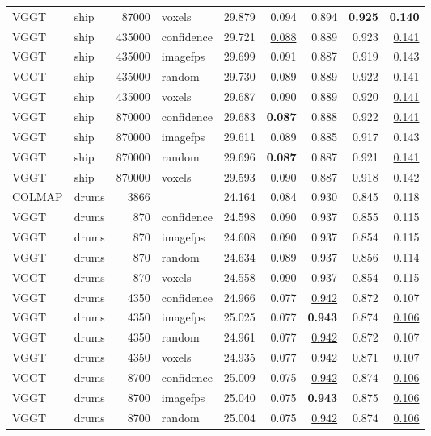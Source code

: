 \begin{table}[H]
\begin{tabular}{llrlrrrrr}
VGGT & ship & 87000 & voxels & 29.879 & 0.094 & 0.894 & \textbf{0.925} & \textbf{0.140} \\
VGGT & ship & 435000 & confidence & 29.721 & \underline{0.088} & 0.889 & 0.923 & \underline{0.141} \\
VGGT & ship & 435000 & imagefps & 29.699 & 0.091 & 0.887 & 0.919 & 0.143 \\
VGGT & ship & 435000 & random & 29.730 & 0.089 & 0.889 & 0.922 & \underline{0.141} \\
VGGT & ship & 435000 & voxels & 29.687 & 0.090 & 0.889 & 0.920 & \underline{0.141} \\
VGGT & ship & 870000 & confidence & 29.683 & \textbf{0.087} & 0.888 & 0.922 & \underline{0.141} \\
VGGT & ship & 870000 & imagefps & 29.611 & 0.089 & 0.885 & 0.917 & 0.143 \\
VGGT & ship & 870000 & random & 29.696 & \textbf{0.087} & 0.887 & 0.921 & \underline{0.141} \\
VGGT & ship & 870000 & voxels & 29.593 & 0.090 & 0.887 & 0.918 & 0.142 \\
\midrule
COLMAP & drums & 3866 &  & 24.164 & 0.084 & 0.930 & 0.845 & 0.118 \\
VGGT & drums & 870 & confidence & 24.598 & 0.090 & 0.937 & 0.855 & 0.115 \\
VGGT & drums & 870 & imagefps & 24.608 & 0.090 & 0.937 & 0.854 & 0.115 \\
VGGT & drums & 870 & random & 24.634 & 0.089 & 0.937 & 0.856 & 0.114 \\
VGGT & drums & 870 & voxels & 24.558 & 0.090 & 0.937 & 0.854 & 0.115 \\
VGGT & drums & 4350 & confidence & 24.966 & 0.077 & \underline{0.942} & 0.872 & 0.107 \\
VGGT & drums & 4350 & imagefps & 25.025 & 0.077 & \textbf{0.943} & 0.874 & \underline{0.106} \\
VGGT & drums & 4350 & random & 24.961 & 0.077 & \underline{0.942} & 0.872 & 0.107 \\
VGGT & drums & 4350 & voxels & 24.935 & 0.077 & \underline{0.942} & 0.871 & 0.107 \\
VGGT & drums & 8700 & confidence & 25.009 & 0.075 & \underline{0.942} & 0.874 & \underline{0.106} \\
VGGT & drums & 8700 & imagefps & 25.040 & 0.075 & \textbf{0.943} & 0.875 & \underline{0.106} \\
VGGT & drums & 8700 & random & 25.004 & 0.075 & \underline{0.942} & 0.874 & \underline{0.106} \\

\end{tabular}
\end{table}
